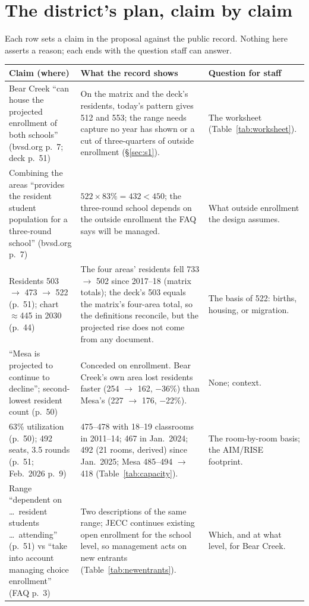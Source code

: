 \documentclass[11pt]{article}
\begin{document}
\section{The district's plan, claim by claim}\label{app:claims}
Each row sets a claim in the proposal against the public record. Nothing here asserts a reason; each ends with the question staff can answer.

\begin{small}
\begin{longtable}{p{3.6cm}p{6.6cm}p{4.2cm}}
\toprule
Claim (where) & What the record shows & Question for staff \\
\midrule
\endhead
Bear Creek ``can house the projected enrollment of both schools'' (bvsd.org p.\ 7; deck p.\ 51) & On the matrix and the deck's residents, today's pattern gives 512 and 553; the range needs capture no year has shown or a cut of three-quarters of outside enrollment (\S\ref{sec:s1}). & The worksheet (Table~\ref{tab:worksheet}). \\
Combining the areas ``provides the resident student population for a three-round school'' (bvsd.org p.\ 7) & $522 \times 83\% = 432 < 450$; the three-round school depends on the outside enrollment the FAQ says will be managed. & What outside enrollment the design assumes. \\
Residents 503 $\to$ 473 $\to$ 522 (p.\ 51); chart $\approx$445 in 2030 (p.\ 44) & The four areas' residents fell 733 $\to$ 502 since 2017--18 (matrix totals); the deck's 503 equals the matrix's four-area total, so the definitions reconcile, but the projected rise does not come from any document. & The basis of 522: births, housing, or migration. \\
``Mesa is projected to continue to decline''; second-lowest resident count (p.\ 50) & Conceded on enrollment. Bear Creek's own area lost residents faster (254 $\to$ 162, $-$36\%) than Mesa's (227 $\to$ 176, $-$22\%). & None; context. \\
63\% utilization (p.\ 50); 492 seats, 3.5 rounds (p.\ 51; Feb.\ 2026 p.\ 9) & 475--478 with 18--19 classrooms in 2011--14; 467 in Jan.\ 2024; 492 (21 rooms, derived) since Jan.\ 2025; Mesa 485--494 $\to$ 418 (Table~\ref{tab:capacity}). & The room-by-room basis; the AIM/RISE footprint. \\
Range ``dependent on \ldots\ resident students \ldots\ attending'' (p.\ 51) vs ``take into account managing choice enrollment'' (FAQ p.\ 3) & Two descriptions of the same range; JECC continues existing open enrollment for the school level, so management acts on new entrants (Table~\ref{tab:newentrants}). & Which, and at what level, for Bear Creek. \\

\end{longtable}
\end{small}
\end{document}
